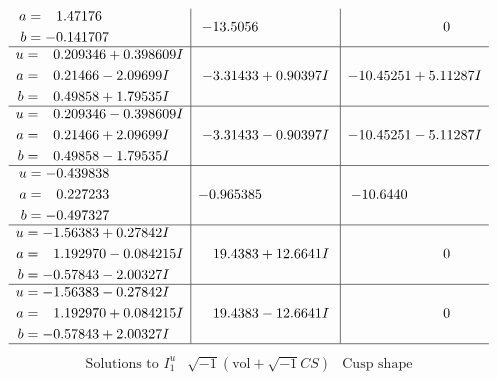 \documentclass[1p]{elsarticle_modified}
\theoremstyle{definition}
\newcommand{\I}{\sqrt{-1}}
\begin{document}
$$\begin{array}{c|c|c}
\begin{aligned}
a &= \phantom{-}1.47176\phantom{ +0.000000I} \\
b &= -0.141707\phantom{ +0.000000I}\end{aligned}
 & -13.5056\phantom{ +0.000000I} & \phantom{-0.000000 } 0 \\ \hline\begin{aligned}
u &= \phantom{-}0.209346 + 0.398609 I \\
a &= \phantom{-}0.21466 - 2.09699 I \\
b &= \phantom{-}0.49858 + 1.79535 I\end{aligned}
 & -3.31433 + 0.90397 I & -10.45251 + 5.11287 I \\ \hline\begin{aligned}
u &= \phantom{-}0.209346 - 0.398609 I \\
a &= \phantom{-}0.21466 + 2.09699 I \\
b &= \phantom{-}0.49858 - 1.79535 I\end{aligned}
 & -3.31433 - 0.90397 I & -10.45251 - 5.11287 I \\ \hline\begin{aligned}
u &= -0.439838\phantom{ +0.000000I} \\
a &= \phantom{-}0.227233\phantom{ +0.000000I} \\
b &= -0.497327\phantom{ +0.000000I}\end{aligned}
 & -0.965385\phantom{ +0.000000I} & -10.6440\phantom{ +0.000000I} \\ \hline\begin{aligned}
u &= -1.56383 + 0.27842 I \\
a &= \phantom{-}1.192970 - 0.084215 I \\
b &= -0.57843 - 2.00327 I\end{aligned}
 & \phantom{-}19.4383 + 12.6641 I & \phantom{-0.000000 } 0 \\ \hline\begin{aligned}
u &= -1.56383 - 0.27842 I \\
a &= \phantom{-}1.192970 + 0.084215 I \\
b &= -0.57843 + 2.00327 I\end{aligned}
 & \phantom{-}19.4383 - 12.6641 I & \phantom{-0.000000 } 0\\
 \hline 
 \end{array}$$\newpage$$\begin{array}{c|c|c}  
\text{Solutions to }I^u_{1}& \I (\text{vol} + \sqrt{-1}CS) & \text{Cusp shape}\\
 \hline 
\begin{aligned}

\end{aligned}
\end{array}$$
\end{document}

